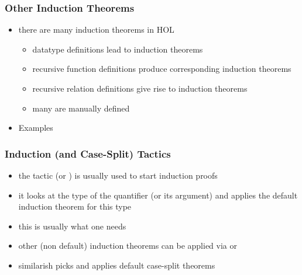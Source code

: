 \begin{frame}
\frametitle{Other Induction Theorems}
\begin{itemize}
\item there are many induction theorems in HOL
\begin{itemize}
\item datatype definitions lead to induction theorems
\item recursive function definitions produce corresponding induction theorems
\item recursive relation definitions give rise to induction theorems
\item many are manually defined
\end{itemize}
\item Examples\\

\end{itemize}
\end{frame}


\begin{frame}
\frametitle{Induction (and Case-Split) Tactics}
\begin{itemize}
\item the tactic  (or ) is usually used to start induction proofs
\item it looks at the type of the quantifier (or its argument) and applies the default induction theorem for this type
\item this is usually what one needs
\item other (non default) induction theorems can be applied via  or 
\item similarish  picks and applies default case-split theorems
\end{itemize}
\end{frame}


